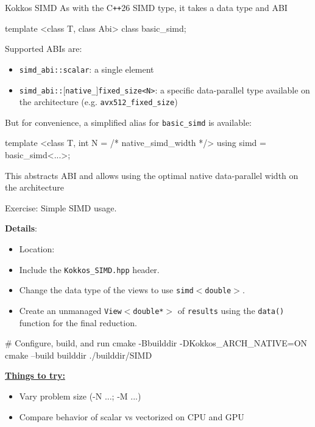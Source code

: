 \begin{frame}[fragile]{Kokkos SIMD}
  As with the C\texttt{++}26 SIMD type, it takes a data type and ABI
  \begin{code}
     template <class T, class Abi>
     class basic_simd;
  \end{code}

  Supported ABIs are:
  \begin{itemize}
    \item \texttt{simd\_abi::scalar}: a single element
    \item \texttt{simd\_abi::$[$native\_$]$fixed\_size<N>}: a specific data-parallel type available on the architecture (e.g. \texttt{avx512\_fixed\_size})
  \end{itemize}

  But for convenience, a simplified alias for \texttt{basic\_simd} is available:
  \begin{code}
    template <class T, int N = /* native_simd_width */>
    using simd = basic_simd<...>;
  \end{code}

  This abstracts ABI and allows using the optimal native data-parallel width on the architecture

\end{frame}

\begin{frame}[fragile]{Exercise: Simple SIMD usage.}

  \textbf{Details}:
  \begin{small}
  \begin{itemize}
\item Location: 
\item Include the \texttt{Kokkos\_SIMD.hpp} header.
\item Change the data type of the views to use \texttt{simd$<$double$>$}.
\item Create an unmanaged \texttt{View$<$double*$>$} of \texttt{results} using the \texttt{data()} function for the final reduction.  
\end{itemize}
  \end{small}

\begin{code}
  # Configure, build, and run
    cmake -Bbuilddir -DKokkos_ARCH_NATIVE=ON
    cmake --build builddir
    ./builddir/SIMD
\end{code}

	\vspace{-3pt}
\ul{\textbf{Things to try:}}
  \begin{small}
  \begin{itemize}
  \item Vary problem size (-N ...; -M ...)
  \item Compare behavior of scalar vs vectorized on CPU and GPU
  \end{itemize}
  \end{small}



\end{frame}

